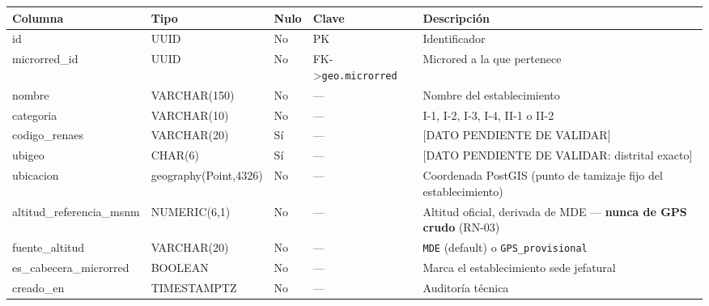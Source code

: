\documentclass[11pt,a4paper]{article}
\begin{document}
{\small
\begin{longtable}[]{@{}
  >{\raggedright\arraybackslash}p{}
  >{\raggedright\arraybackslash}p{}
  >{\raggedright\arraybackslash}p{}
  >{\raggedright\arraybackslash}p{}
  >{\raggedright\arraybackslash}p{}@{}}
\toprule\noalign{}
\begin{minipage}[b]{\linewidth}\raggedright
Columna
\end{minipage} & \begin{minipage}[b]{\linewidth}\raggedright
Tipo
\end{minipage} & \begin{minipage}[b]{\linewidth}\raggedright
Nulo
\end{minipage} & \begin{minipage}[b]{\linewidth}\raggedright
Clave
\end{minipage} & \begin{minipage}[b]{\linewidth}\raggedright
Descripción
\end{minipage} \\
\midrule\noalign{}
\endhead
\bottomrule\noalign{}
\endlastfoot
id & UUID & No & PK & Identificador \\
microrred\_id & UUID & No & FK-\textgreater{}\texttt{geo.microrred} & Microred a la que pertenece \\
nombre & VARCHAR(150) & No & --- & Nombre del establecimiento \\
categoria & VARCHAR(10) & No & --- & I-1, I-2, I-3, I-4, II-1 o II-2 \\
codigo\_renaes & VARCHAR(20) & Sí & --- & {[}DATO PENDIENTE DE VALIDAR{]} \\
ubigeo & CHAR(6) & Sí & --- & {[}DATO PENDIENTE DE VALIDAR: distrital exacto{]} \\
ubicacion & geography(Point,4326) & No & --- & Coordenada PostGIS (punto de tamizaje fijo del establecimiento) \\
altitud\_referencia\_msnm & NUMERIC(6,1) & No & --- & Altitud oficial, derivada de MDE --- \textbf{nunca de GPS crudo} (RN-03) \\
fuente\_altitud & VARCHAR(20) & No & --- & \texttt{MDE} (default) o \texttt{GPS\_provisional} \\
es\_cabecera\_microrred & BOOLEAN & No & --- & Marca el establecimiento sede jefatural \\
creado\_en & TIMESTAMPTZ & No & --- & Auditoría técnica \\
\end{longtable}
}
\end{document}
